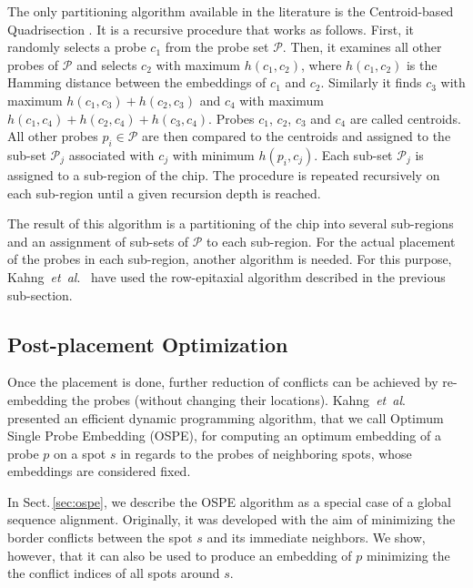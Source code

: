 \documentclass{llncs}
\begin{document}
The only partitioning algorithm available in the literature is the Centroid-based
Quadrisection \cite{KAHNG03B}. It is a recursive procedure that works as follows.
First, it randomly selects a probe $c_1$ from the probe set $\mathcal{P}$. Then,
it examines all other probes of $\mathcal{P}$ and selects $c_2$ with maximum
$h(c_1,c_2)$, where $h(c_1,c_2)$ is the Hamming distance between the embeddings
of $c_1$ and $c_2$. Similarly it finds $c_3$ with maximum $h(c_1,c_3) + h(c_2,c_3)$
and $c_4$ with maximum $h(c_1,c_4) + h(c_2,c_4) + h(c_3,c_4)$. Probes
$c_1$, $c_2$, $c_3$ and $c_4$ are called centroids. All other probes
$p_i \in \mathcal{P}$ are then compared to the centroids and assigned to the sub-set
$\mathcal{P}_j$ associated with $c_j$ with minimum $h(p_i,c_j)$. Each sub-set
$\mathcal{P}_j$ is assigned to a sub-region of the chip. The procedure is repeated
recursively on each sub-region until a given recursion depth is reached.

The result of this algorithm is a partitioning of the chip into several sub-regions
and an assignment of sub-sets of $\mathcal{P}$ to each sub-region. For the actual
placement of the probes in each sub-region, another algorithm is needed. For this
purpose, Kahng~{\it et~al}.~\cite{KAHNG03B} have used the row-epitaxial algorithm
described in the previous sub-section.

\subsection{Post-placement Optimization}
\label{sec:optimization}

Once the placement is done, further reduction of conflicts can be
achieved by re-embedding the probes (without changing their locations).
Kahng~{\it et~al}.~\cite{KAHNG02} presented an efficient dynamic programming
algorithm, that we call Optimum Single Probe Embedding (OSPE), for computing an
optimum embedding of a probe $p$ on a spot $s$ in regards to the probes of
neighboring spots, whose embeddings are considered fixed.

In Sect.\,\ref{sec:ospe}, we describe the OSPE algorithm as a special case of a
global sequence alignment. Originally, it was developed with the aim of minimizing
the border conflicts between the spot $s$ and its immediate neighbors. We show,
however, that it can also be used to produce an embedding of $p$ minimizing the
the conflict indices of all spots around $s$.
\end{document}
